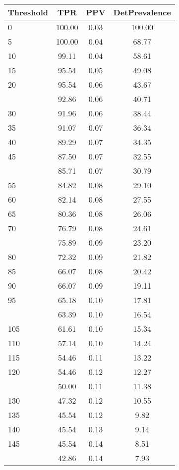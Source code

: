 \begin{table}[ht]
\centering
\begin{tabular}{lccc}
  \toprule
Threshold & TPR & PPV & DetPrevalence \\ 
  \midrule
0 & 100.00 & 0.03 & 100.00 \\ 
  5 & 100.00 & 0.04 & 68.77 \\ 
  10 & 99.11 & 0.04 & 58.61 \\ 
  15 & 95.54 & 0.05 & 49.08 \\ 
  20 & 95.54 & 0.06 & 43.67 \\ 
   \addlinespace
25 & 92.86 & 0.06 & 40.71 \\ 
  30 & 91.96 & 0.06 & 38.44 \\ 
  35 & 91.07 & 0.07 & 36.34 \\ 
  40 & 89.29 & 0.07 & 34.35 \\ 
  45 & 87.50 & 0.07 & 32.55 \\ 
   \addlinespace
50 & 85.71 & 0.07 & 30.79 \\ 
  55 & 84.82 & 0.08 & 29.10 \\ 
  60 & 82.14 & 0.08 & 27.55 \\ 
  65 & 80.36 & 0.08 & 26.06 \\ 
  70 & 76.79 & 0.08 & 24.61 \\ 
   \addlinespace
75 & 75.89 & 0.09 & 23.20 \\ 
  80 & 72.32 & 0.09 & 21.82 \\ 
  85 & 66.07 & 0.08 & 20.42 \\ 
  90 & 66.07 & 0.09 & 19.11 \\ 
  95 & 65.18 & 0.10 & 17.81 \\ 
   \addlinespace
100 & 63.39 & 0.10 & 16.54 \\ 
  105 & 61.61 & 0.10 & 15.34 \\ 
  110 & 57.14 & 0.10 & 14.24 \\ 
  115 & 54.46 & 0.11 & 13.22 \\ 
  120 & 54.46 & 0.12 & 12.27 \\ 
   \addlinespace
125 & 50.00 & 0.11 & 11.38 \\ 
  130 & 47.32 & 0.12 & 10.55 \\ 
  135 & 45.54 & 0.12 & 9.82 \\ 
  140 & 45.54 & 0.13 & 9.14 \\ 
  145 & 45.54 & 0.14 & 8.51 \\ 
   \addlinespace
150 & 42.86 & 0.14 & 7.93 \\ 

\end{tabular}
\end{table}
